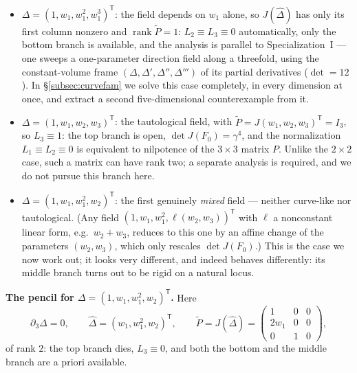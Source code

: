 \documentclass[11pt]{article}
\numberwithin{equation}{section}
\theoremstyle{plain}
\theoremstyle{definition}
\theoremstyle{remark}
\begin{document}
\begin{itemize}
\item $\Delta=(1,w_1,w_1^2,w_1^3)^{\mathsf T}$: the field depends on $w_1$ alone, so
$J(\widehat\Delta)$ has only its first column nonzero and
$\operatorname{rank}\widetilde P=1$: $L_2\equiv L_3\equiv0$ automatically, only
the bottom branch is available, and the analysis is parallel to
Specialization~I --- one sweeps a one-parameter direction field along a
threefold, using the constant-volume frame $(\Delta,\Delta',\Delta'',\Delta''')$
of its partial derivatives ($\det=12$). In \S\ref{subsec:curvefam} we solve this case
completely, in every dimension at once, and extract a second five-dimensional
counterexample from it.
\item $\Delta=(1,w_1,w_2,w_3)^{\mathsf T}$: the tautological field, with
$\widetilde P=J(w_1,w_2,w_3)^{\mathsf T}=I_3$, so $L_3\equiv1$: the top branch
is open, $\det J(F_0)=\gamma^4$, and the normalization $L_1\equiv L_2\equiv0$
is equivalent to nilpotence of the $3\times3$ matrix $P$.
Unlike the $2\times2$ case, such a matrix can have rank two; a separate
analysis is required, and we do not pursue this branch here.
\item $\Delta=(1,w_1,w_1^2,w_2)^{\mathsf T}$: the first genuinely \emph{mixed} field ---
neither curve-like nor tautological. (Any field
$(1,w_1,w_1^2,\ell(w_2,w_3))^{\mathsf T}$ with $\ell$ a nonconstant linear
form, e.g.\ $w_2+w_3$, reduces to this one by an affine change of the
parameters $(w_2,w_3)$, which only rescales $\det J(F_0)$.) This is the case
we now work out; it looks very different, and indeed behaves differently: its
middle branch turns out to be rigid on a natural locus.
\end{itemize}

\medskip\noindent\textbf{The pencil for $\Delta=(1,w_1,w_1^2,w_2)^{\mathsf T}$.}
Here
\[
\partial_3\Delta=0,\qquad
\widehat\Delta=(w_1,w_1^2,w_2)^{\mathsf T},\qquad
\widetilde P=J(\widehat\Delta)=
\begin{pmatrix}1&0&0\\ 2w_1&0&0\\ 0&1&0\end{pmatrix},
\]
of rank $2$: the top branch dies, $L_3\equiv0$, and both the bottom and the
middle branch are a priori available.
\end{document}
